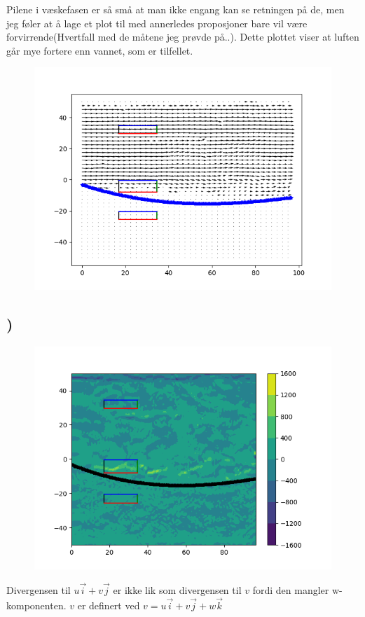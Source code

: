 \documentclass[a4paper,10pt,norsk]{article}
\begin{document}
Pilene i væskefasen er så små at man ikke engang kan se retningen på de, men jeg føler at å lage et plot til med annerledes proposjoner bare vil være forvirrende(Hvertfall med de måtene jeg prøvde på..). Dette plottet viser at luften går mye fortere enn vannet, som er tilfellet.
\begin{figure}[h!]
        \centering 
        \includegraphics[scale=0.9]{oppg_c.png} 
\end{figure}

\pagebreak
\subsection{)}


\begin{figure}[h!]
        \centering 
        \includegraphics[scale=0.9]{oppg_d.png} 
\end{figure}
Divergensen til $u\vec{i} + v\vec{j}$ er ikke lik som divergensen til $v$ fordi den mangler w-komponenten. 
$v$ er definert ved $v = u\vec{i} + v\vec{j} + w\vec{k}$
\end{document}
